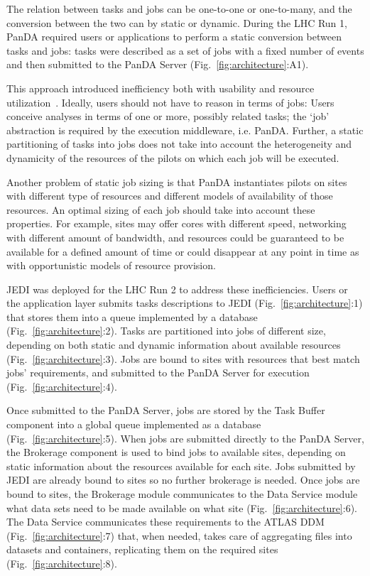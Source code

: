 The relation between tasks and jobs can be one-to-one or one-to-many, and the
conversion between the two can by static or dynamic. During the LHC Run 1, PanDA
required users or applications to perform a static conversion between tasks and
jobs: tasks were described as a set of jobs with a fixed number of events and
then submitted to the PanDA Server (Fig.~\ref{fig:architecture}:A1).

This approach introduced inefficiency both with usability and resource
utilization~\cite{borodin2015unified}. Ideally, users should not have to reason
in terms of jobs: Users conceive analyses in terms of one or more, possibly
related tasks; the `job' abstraction is required by the execution middleware,
i.e. PanDA. Further, a static partitioning of tasks into jobs does not take into
account the heterogeneity and dynamicity of the resources of the pilots on which
each job will be executed.

Another problem of static job sizing is that PanDA instantiates pilots on sites
with different type of resources and different models of availability of those
resources. An optimal sizing of each job should take into account these
properties. For example, sites may offer cores with different speed, networking
with different amount of bandwidth, and resources could be guaranteed to be
available for a defined amount of time or could disappear at any point in time
as with opportunistic models of resource provision.

JEDI was deployed for the LHC Run 2 to address these inefficiencies. Users or
the application layer submits tasks descriptions to JEDI
(Fig.~\ref{fig:architecture}:1) that stores them into a queue implemented by a
database (Fig.~\ref{fig:architecture}:2). Tasks are partitioned into jobs of
different size, depending on both static and dynamic information about available
resources (Fig.~\ref{fig:architecture}:3). Jobs are bound to sites with
resources that best match jobs' requirements, and submitted to the PanDA Server
for execution (Fig.~\ref{fig:architecture}:4).

Once submitted to the PanDA Server, jobs are stored by the Task Buffer component
into a global queue implemented as a  database (Fig.~\ref{fig:architecture}:5).
When jobs are submitted directly to the PanDA Server, the Brokerage component is
used to bind jobs to available sites, depending on static information about the
resources available for each site. Jobs submitted by JEDI are already bound to
sites so no further brokerage is needed. Once jobs are bound to sites, the
Brokerage module communicates to the Data Service module what data sets need to
be made available on what site (Fig.~\ref{fig:architecture}:6). The Data Service
communicates these requirements to the ATLAS DDM (Fig.~\ref{fig:architecture}:7)
that, when needed, takes care of aggregating files into datasets and containers,
replicating them on the required sites (Fig.~\ref{fig:architecture}:8).

